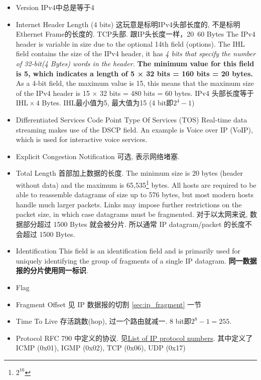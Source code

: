 \documentclass[a4paper]{report}
\begin{document}
\begin{itemize}
  \item Version
  \subitem IPv4中总是等于4
  \item Internet Header Length (4 bits)
  \subitem 这玩意是标明IPv4头部长度的, 不是标明Ethernet Frame的长度的. 
  \subitem TCP头部. 跟IP头长度一样，20~60 Bytes
  \subitem The IPv4 header is variable in size due to the optional 14th field (options). The IHL field contains the size of the IPv4 header, it has \emph{4 bits that specify the number of 32-bit(4 Bytes) words in the header.} \textbf{The minimum value for this field is 5, which indicates a length of 5 × 32 bits = 160 bits = 20 bytes.} As a 4-bit field, the maximum value is 15, this means that the maximum size of the IPv4 header is 15 × 32 bits = 480 bits = 60 bytes.
  \subitem IPv4 头部长度等于 $\text{IHL}\times 4$ Bytes. IHL最小值为5, 最大值为15 (4 bit即$2^4-1$)
  \item Differentiated Services Code Point 
  \subitem Type Of Services (TOS) Real-time data streaming makes use of the DSCP field. An example is Voice over IP (VoIP), which is used for interactive voice services.
  \item Explicit Congestion Notification 
  \subitem 可选, 表示网络堵塞. 
  \item Total Length
  \subitem 首部加上数据的长度. The minimum size is 20 bytes (header without data) and the maximum is 65,535\footnote{$2^{16}$} bytes. 
  \subitem All hosts are required to be able to reassemble datagrams of size up to 576 bytes, but most modern hosts handle much larger packets. 
  \subitem Links may impose further restrictions on the packet size, in which case datagrams must be fragmented. 
  \subitem 对于以太网来说, 数据部分超过 1500 Bytes 就会被分片. 所以通常 IP datagram/packet 的长度不会超过 1500 Bytes. 
  \item Identification
  \subitem This field is an identification field and is primarily used for uniquely identifying the group of fragments of a single IP datagram. \textbf{同一数据报的分片使用同一标识}. 
  \item Flag
  \item Fragment Offset
  \subitem 见 IP 数据报的切割 \ref{sec:ip_fragment} 一节
  \item Time To Live
  \subitem 存活跳数(hop), 过一个路由就减一. 8 bit即$2^8-1=255$. 
  \item Protocol
  \subitem RFC 790 中定义的协议. 见\href{https://en.wikipedia.org/wiki/List_of_IP_protocol_numbers}{List of IP protocol numbers}. 其中定义了ICMP (0x01), IGMP (0x02), TCP (0x06), UDP (0x17)

\end{itemize}
\end{document}
